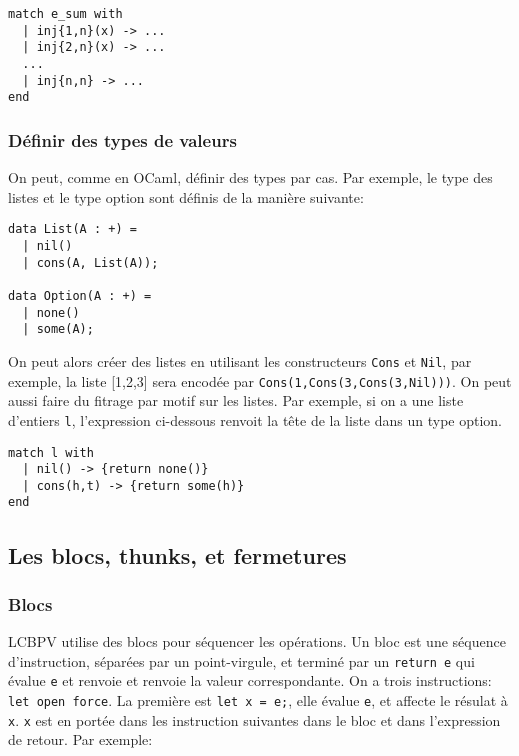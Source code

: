 \documentclass[
]{article}
\begin{document}
\begin{verbatim}
match e_sum with
  | inj{1,n}(x) -> ...
  | inj{2,n}(x) -> ...
  ...
  | inj{n,n} -> ...
end
\end{verbatim}

\hypertarget{duxe9finir-des-types-de-valeurs}{%
\subsubsection{Définir des types de
valeurs}\label{duxe9finir-des-types-de-valeurs}}

On peut, comme en OCaml, définir des types par cas. Par exemple, le type
des listes et le type option sont définis de la manière suivante:

\begin{verbatim}
data List(A : +) =
  | nil()
  | cons(A, List(A));

data Option(A : +) =
  | none()
  | some(A);
\end{verbatim}

On peut alors créer des listes en utilisant les constructeurs
\texttt{Cons} et \texttt{Nil}, par exemple, la liste {[}1,2,3{]} sera
encodée par \texttt{Cons(1,Cons(3,Cons(3,Nil)))}. On peut aussi faire du
fitrage par motif sur les listes. Par exemple, si on a une liste
d'entiers \texttt{l}, l'expression ci-dessous renvoit la tête de la
liste dans un type option.

\begin{verbatim}
match l with 
  | nil() -> {return none()}
  | cons(h,t) -> {return some(h)}
end 
\end{verbatim}

\hypertarget{les-blocs-thunks-et-fermetures}{%
\subsection{Les blocs, thunks, et
fermetures}\label{les-blocs-thunks-et-fermetures}}

\hypertarget{blocs}{%
\subsubsection{Blocs}\label{blocs}}

LCBPV utilise des blocs pour séquencer les opérations. Un bloc est une
séquence d'instruction, séparées par un point-virgule, et terminé par un
\texttt{return\ e} qui évalue \texttt{e} et renvoie et renvoie la valeur
correspondante. On a trois instructions: \texttt{let\ open\ force}. La
première est \texttt{let\ x\ =\ e;}, elle évalue \texttt{e}, et affecte
le résulat à \texttt{x}. \texttt{x} est en portée dans les instruction
suivantes dans le bloc et dans l'expression de retour. Par exemple:
\end{document}

